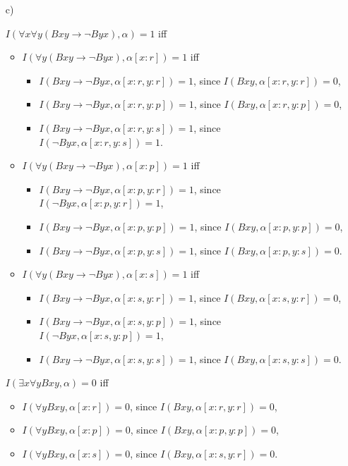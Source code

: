 \begin{enumerate}[label=\alph*)]
\item[c)]

$I(\forall x \forall y (Bxy \to \neg Byx), \alpha) = 1$ iff
\vspace{-\parskip}
\begin{itemize}[noitemsep, leftmargin=*]
\item $I(\forall y (Bxy \to \neg Byx), \alpha[x : r]) = 1$ iff
   \begin{itemize}[topsep=-\parskip, noitemsep, leftmargin=*]
   \item $I(Bxy \to \neg Byx, \alpha[x : r, y : r]) = 1$, since $I(Bxy, \alpha[x : r, y : r]) = 0$,
   \item $I(Bxy \to \neg Byx, \alpha[x : r, y : p]) = 1$, since $I(Bxy, \alpha[x : r, y : p]) = 0$,
   \item $I(Bxy \to \neg Byx, \alpha[x : r, y : s]) = 1$, since $I(\neg Byx, \alpha[x : r, y : s]) = 1$.
   \end{itemize}
\item $I(\forall y (Bxy \to \neg Byx), \alpha[x : p]) = 1$ iff
   \begin{itemize}[topsep=-\parskip, noitemsep, leftmargin=*]
   \item $I(Bxy \to \neg Byx, \alpha[x : p, y : r]) = 1$, since $I(\neg Byx, \alpha[x : p, y : r]) = 1$,
   \item $I(Bxy \to \neg Byx, \alpha[x : p, y : p]) = 1$, since $I(Bxy, \alpha[x : p, y : p]) = 0$,
   \item $I(Bxy \to \neg Byx, \alpha[x : p, y : s]) = 1$, since $I(Bxy, \alpha[x : p, y : s]) = 0$.
   \end{itemize}
\item $I(\forall y (Bxy \to \neg Byx), \alpha[x : s]) = 1$ iff
   \begin{itemize}[topsep=-\parskip, noitemsep, leftmargin=*]
   \item $I(Bxy \to \neg Byx, \alpha[x : s, y : r]) = 1$, since $I(Bxy, \alpha[x : s, y : r]) = 0$,
   \item $I(Bxy \to \neg Byx, \alpha[x : s, y : p]) = 1$, since $I(\neg Byx, \alpha[x : s, y : p]) = 1$,
   \item $I(Bxy \to \neg Byx, \alpha[x : s, y : s]) = 1$, since $I(Bxy, \alpha[x : s, y : s]) = 0$.
   \end{itemize}
\end{itemize}

$I(\exists x \forall y Bxy, \alpha) = 0$ iff
\vspace{-\parskip}
\begin{itemize}[noitemsep, leftmargin=*]
\item $I(\forall y Bxy, \alpha[x : r]) = 0$, since $I(Bxy, \alpha[x : r, y : r]) = 0$,
\item $I(\forall y Bxy, \alpha[x : p]) = 0$, since $I(Bxy, \alpha[x : p, y : p]) = 0$,
\item $I(\forall y Bxy, \alpha[x : s]) = 0$, since $I(Bxy, \alpha[x : s, y : r]) = 0$.
\end{itemize}


\end{enumerate}
